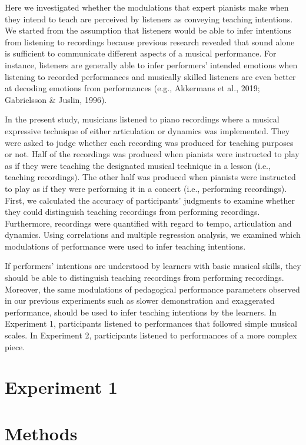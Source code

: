 \documentclass[
  man,floatsintext]{apa6}
\begin{document}
Here we investigated whether the modulations that expert pianists make when they intend to teach are perceived by listeners as conveying teaching intentions. We started from the assumption that listeners would be able to infer intentions from listening to recordings because previous research revealed that sound alone is sufficient to communicate different aspects of a musical performance. For instance, listeners are generally able to infer performers' intended emotions when listening to recorded performances and musically skilled listeners are even better at decoding emotions from performances (e.g., Akkermans et al., 2019; Gabrielsson \& Juslin, 1996).

In the present study, musicians listened to piano recordings where a musical expressive technique of either articulation or dynamics was implemented. They were asked to judge whether each recording was produced for teaching purposes or not. Half of the recordings was produced when pianists were instructed to play as if they were teaching the designated musical technique in a lesson (i.e., teaching recordings). The other half was produced when pianists were instructed to play as if they were performing it in a concert (i.e., performing recordings). First, we calculated the accuracy of participants' judgments to examine whether they could distinguish teaching recordings from performing recordings. Furthermore, recordings were quantified with regard to tempo, articulation and dynamics. Using correlations and multiple regression analysis, we examined which modulations of performance were used to infer teaching intentions.

If performers' intentions are understood by learners with basic musical skills, they should be able to distinguish teaching recordings from performing recordings. Moreover, the same modulations of pedagogical performance parameters observed in our previous experiments such as slower demonstration and exaggerated performance, should be used to infer teaching intentions by the learners. In Experiment 1, participants listened to performances that followed simple musical scales. In Experiment 2, participants listened to performances of a more complex piece.

\hypertarget{experiment-1}{%
\section{Experiment 1}\label{experiment-1}}

\hypertarget{methods}{%
\section{Methods}\label{methods}}
\end{document}
